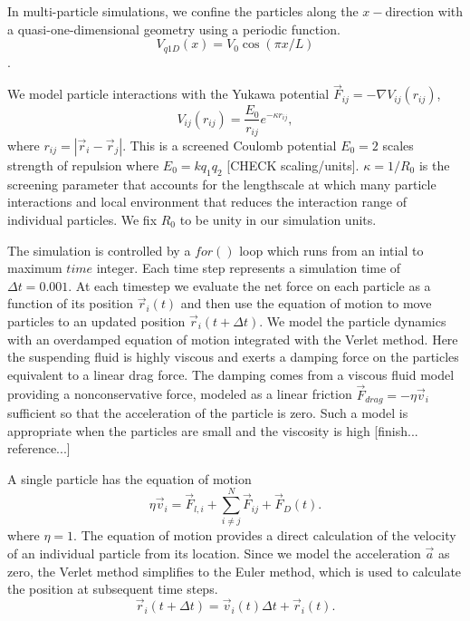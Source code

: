 \documentclass[prb,preprint]{revtex4}
\begin{document}
 In multi-particle simulations, we confine
 the particles along the $x-$direction with a
 quasi-one-dimensional geometry
 using a periodic function.
 \begin{equation}
   V_{q1D}(x) = V_0 \cos{(\pi x / L)}
 \end{equation}.
 
 We model particle interactions with
 the Yukawa potential $\vec{F}_{ij} = -\nabla V_{ij}(r_{ij})$,
 \begin{equation}
   V_{ij}(r_{ij}) = \frac{E_0}{r_{ij}} e^{-\kappa r_{ij}},
 \end{equation}
 where $r_{ij} = |\vec{r}_i - \vec{r}_j|$.
 This is a
 screened Coulomb potential
 $E_0=2$ scales strength of repulsion
 where $E_0 = k q_1 q_2$  [CHECK scaling/units].
 $\kappa = 1/R_0$ is the screening parameter 
that accounts for the lengthscale at
which many particle
interactions and local environment
that reduces the interaction range of individual particles.
We fix $R_0$ to be unity in our simulation units.

The simulation is controlled by a $for()$ loop
which runs from an intial to maximum $time$ integer.
Each time step represents a simulation time of $\Delta t=0.001$.
At each timestep
we evaluate the net force on each particle as a function of its position
$\vec{r}_i(t)$
and then use the equation of motion to move particles
to an updated position
$\vec{r}_i(t+\Delta t)$.
%
We model the 
particle dynamics 
with an overdamped
equation of motion
integrated with the Verlet method.
Here 
the suspending fluid is highly viscous
and exerts a damping force on the particles equivalent
to a linear drag force.
The damping comes from a viscous fluid model
providing a nonconservative force,
modeled as a linear friction $\vec{F}_{drag} = -\eta \vec{v}_i$
sufficient so that
the acceleration of the particle is zero.
Such a model is appropriate when the particles
are small and the viscosity is high [finish... reference...]

A single particle has the equation of motion 
\begin{equation}
\eta \vec{v}_i = \vec{F}_{l,i} + \sum_{i \neq j}^{N} \vec{F}_{ij} + \vec{F}_{D}(t).
\end{equation}
where $\eta = 1$.
The equation of motion provides a direct calculation of the velocity
of an individual particle from its location.
Since we model the acceleration $\vec{a}$ as zero,
the Verlet method simplifies to 
the Euler method,
which is used to calculate the position at subsequent time steps.
\begin{equation}
\vec{r}_i(t+\Delta t) = \vec{v}_i(t) \Delta t + \vec{r}_i(t).
\end{equation}
\end{document}

